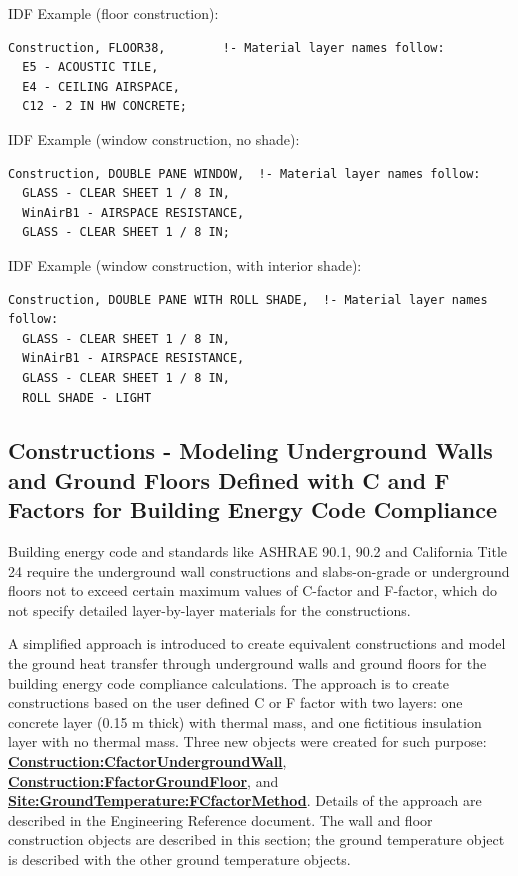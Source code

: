 IDF Example (floor construction):

\begin{lstlisting}
Construction, FLOOR38,        !- Material layer names follow:
  E5 - ACOUSTIC TILE,
  E4 - CEILING AIRSPACE,
  C12 - 2 IN HW CONCRETE;
\end{lstlisting}

IDF Example (window construction, no shade):

\begin{lstlisting}
Construction, DOUBLE PANE WINDOW,  !- Material layer names follow:
  GLASS - CLEAR SHEET 1 / 8 IN,
  WinAirB1 - AIRSPACE RESISTANCE,
  GLASS - CLEAR SHEET 1 / 8 IN;
\end{lstlisting}

IDF Example (window construction, with interior shade):

\begin{lstlisting}
Construction, DOUBLE PANE WITH ROLL SHADE,  !- Material layer names follow:
  GLASS - CLEAR SHEET 1 / 8 IN,
  WinAirB1 - AIRSPACE RESISTANCE,
  GLASS - CLEAR SHEET 1 / 8 IN,
  ROLL SHADE - LIGHT
\end{lstlisting}

\subsection{Constructions - Modeling Underground Walls and Ground Floors Defined with C and F Factors for Building Energy Code Compliance}\label{constructions---modeling-underground-walls-and-ground-floors-defined-with-c-and-f-factors-for-building-energy-code-compliance}

Building energy code and standards like ASHRAE 90.1, 90.2 and California Title 24 require the underground wall constructions and slabs-on-grade or underground floors not to exceed certain maximum values of C-factor and F-factor, which do not specify detailed layer-by-layer materials for the constructions.

A simplified approach is introduced to create equivalent constructions and model the ground heat transfer through underground walls and ground floors for the building energy code compliance calculations. The approach is to create constructions based on the user defined C or F factor with two layers: one concrete layer (0.15 m thick) with thermal mass, and one fictitious insulation layer with no thermal mass. Three new objects were created for such purpose: \textbf{\hyperref[constructioncfactorundergroundwall]{Construction:CfactorUndergroundWall}}, \textbf{\hyperref[constructionffactorgroundfloor]{Construction:FfactorGroundFloor}}, and \textbf{\hyperref[sitegroundtemperaturefcfactormethod]{Site:GroundTemperature:FCfactorMethod}}. Details of the approach are described in the Engineering Reference document. The wall and floor construction objects are described in this section; the ground temperature object is described with the other ground temperature objects.

